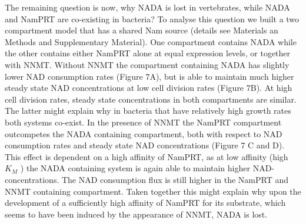 The remaining question is now, why NADA is lost in vertebrates, while NADA and NamPRT are co-existing in bacteria? To analyse this question we built a two compartment model that has a shared Nam source (details see Materials an Methods and Supplementary Material). One compartment contains NADA while the other contains either NamPRT alone at equal expression levels, or together with NNMT.  Without NNMT the compartment containing NADA has slightly lower NAD consumption rates (Figure 7A), but is able to maintain much higher steady state NAD concentrations at low cell division rates  (Figure 7B). At high cell division rates, steady state concentrations in both compartments are similar. The latter might explain why in bacteria that have relatively high growth rates both systems co-exist. 
In the presence of NNMT the NamPRT compartment outcompetes the NADA containing compartment, both with respect to NAD consumption rates and steady state NAD concentrations (Figure 7 C and D). This effect is dependent on a high affinity of NamPRT, as at low affinity (high $K_M$ ) the NADA containing system is again able to maintain higher NAD-concentrations. The NAD consumption flux is still  higher  in the NamPRT and NNMT containing compartment. Taken together this might explain why upon the development of a sufficiently high affinity of NamPRT for its substrate, which seems to have been induced by the appearance of NNMT, NADA is lost.

